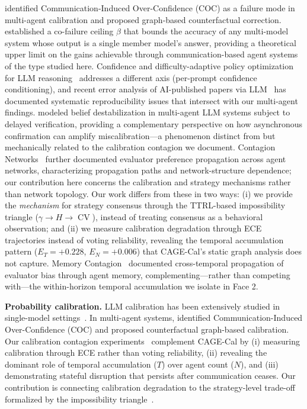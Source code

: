 \documentclass[11pt]{article}
\DeclareMathOperator{\CV}{CV}
\begin{document}
\citet{huang2026cagecal} identified Communication-Induced Over-Confidence (COC) as a failure mode in multi-agent calibration and proposed graph-based counterfactual correction. \citet{chen2026combining} established a co-failure ceiling $\beta$ that bounds the accuracy of any multi-model system whose output is a single member model's answer, providing a theoretical upper limit on the gains achievable through communication-based agent systems of the type studied here. Confidence and difficulty-adaptive policy optimization for LLM reasoning~\cite{tmlr260607950} addresses a different axis (per-prompt confidence conditioning), and recent error analysis of AI-published papers via LLM~\cite{tmlr251205925} has documented systematic reproducibility issues that intersect with our multi-agent findings. \citet{itkin2026delayed} modeled belief destabilization in multi-agent LLM systems subject to delayed verification, providing a complementary perspective on how asynchronous confirmation can amplify miscalibration---a phenomenon distinct from but mechanically related to the calibration contagion we document. Contagion Networks~\citep{contagionnetworks2026} further documented evaluator preference propagation across agent networks, characterizing propagation paths and network-structure dependence; our contribution here concerns the calibration and strategy mechanisms rather than network topology. Our work differs from these in two ways: (i) we provide the \textit{mechanism} for strategy consensus through the TTRL-based impossibility triangle ($\gamma \to H \to \CV$), instead of treating consensus as a behavioral observation; and (ii) we measure calibration degradation through ECE trajectories instead of voting reliability, revealing the temporal accumulation pattern ($E_T = +0.228$, $E_N = +0.006$) that CAGE-Cal's static graph analysis does not capture. Memory Contagion~\citep{liu2025memory} documented cross-temporal propagation of evaluator bias through agent memory, complementing---rather than competing with---the within-horizon temporal accumulation we isolate in Face 2.

\textbf{Probability calibration.} LLM calibration has been extensively studied in single-model settings~\cite{guo2017calibration,jiang2021can}. In multi-agent systems, \citet{huang2026cagecal} identified Communication-Induced Over-Confidence (COC) and proposed counterfactual graph-based calibration. Our calibration contagion experiments~\cite{calibration2026} complement CAGE-Cal by (i) measuring calibration through ECE rather than voting reliability, (ii) revealing the dominant role of temporal accumulation ($T$) over agent count ($N$), and (iii) demonstrating stateful disruption that persists after communication ceases. Our contribution is connecting calibration degradation to the strategy-level trade-off formalized by the impossibility triangle~\cite{impossible2026}.
\end{document}
